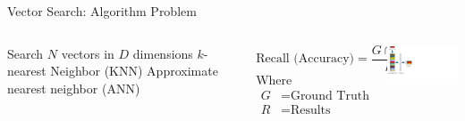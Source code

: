 \placelogofalse
\begin{frame}{Vector Search: Algorithm Problem}
\begin{columns}
\begin{outline}
  \1 Search $N$ vectors in $D$ dimensions 
  \2 $k$-nearest Neighbor (KNN) 
  \2 Approximate nearest neighbor (ANN)
\end{outline}

\vspace{0.2cm}

$$
\text{Recall (Accuracy)} = \frac{G \cap R}{k}
$$
Where
\begin{align*}
  G &= \text{Ground Truth} \\
  R &= \text{Results}
\end{align*}

\begin{center}
\centering
\includegraphics[width=5.0cm, page=1, trim={0 5cm 22cm 0cm},clip]{assets/vec_db_figs.pdf}

\end{center}
\end{columns}
\end{frame}
\placelogotrue

